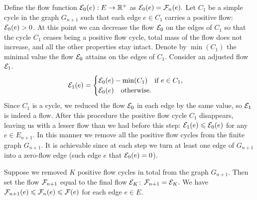 \documentclass[12pt,oneside,a4paper]{amsart}
\begin{document}
        Define the flow function $\cal{E}_0(e): E \to \mathbb{R}^{+}$ as $\cal{E}_0(e) = \flowposn{n}(e).$
        Let $C_1$ be a simple cycle in the graph $G_{n + 1}$ such that each edge $e \in C_1$ carries
          a positive flow: $\cal{E}_0(e) > 0$.
        At this point we can decrease the flow $\cal{E}_0$ on the edges of $C_1$ so that the cycle $C_1$
          ceases being a positive flow cycle, total mass of the flow does not increase, and all the other properties stay intact.
        Denote by $\min(C_1)$ the minimal value the flow $\cal{E}_0$ attains on the edges of $C_1$.
        Consider an adjusted flow $\cal{E}_1$.
        \begin{equation*}
          \cal{E}_1(e) =
          \begin{cases}
            \cal{E}_0(e) - \min(C_1) \quad \text{if } e \in C_1,\\
            \cal{E}_0(e) \quad \text{otherwise}.
          \end{cases}
        \end{equation*}
        Since $C_1$ is a cycle, we reduced the flow $\cal{E}_0$ in each edge by the same value,
          so $\cal{E}_1$ is indeed a flow.
        After this procedure the positive flow cycle $C_1$ disappears,
          leaving us with a lesser flow than we had before this step: $\cal{E}_1(e) \leq \cal{E}_0(e)$ for any $e \in E_{n+1}.$
        In this manner we remove all the positive flow cycles from the finite graph $G_{n + 1}$.
        It is achievable since at each step we turn at least one edge of $G_{n + 1}$
          into a zero-flow edge (such edge $e$ that $\cal{E}_0(e) = 0$).

        Suppose we removed $K$ positive flow cycles in total from the graph $G_{n + 1}$.
        Then set the flow $\flowposn{n+1}$ equal to the final flow $\cal{E}_K$: $\flowposn{n+1} = \cal{E}_K.$
        We have $\flowposn{n+1}(e) \leq \flowposn{n}(e) \leq \flowpos(e)$ for each edge $e \in E$.
\end{document}
